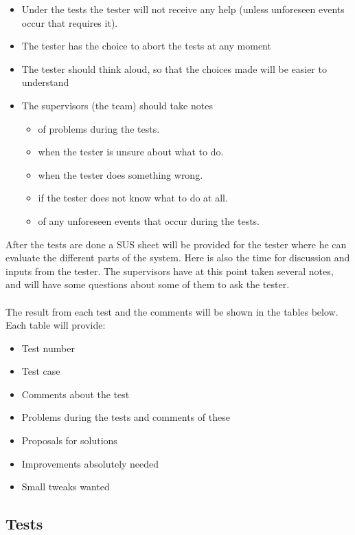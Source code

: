 \begin{itemize} \setlength{\itemsep}{0cm}\setlength{\parskip}{0cm}
	\item Under the tests the tester will not receive any help (unless unforeseen events occur that requires it).
	\item The tester has the choice to abort the tests at any moment
	\item The tester should think aloud, so that the choices made will be easier to understand
	\item The supervisors (the team) should take notes 
	\begin{itemize} \setlength{\itemsep}{0cm}\setlength{\parskip}{0cm}
		\item of problems during the tests.
		\item when the tester is unsure about what to do.
		\item when the tester does something wrong.
		\item if the tester does not know what to do at all.
		\item of any unforeseen events that occur during the tests.
	\end{itemize}
\end{itemize}
\noindent
After the tests are done a SUS sheet will be provided for the tester where he can evaluate the different parts of the system. Here is also the time for discussion and inputs from the tester. The supervisors have at this point taken several notes, and will have some questions about some of them to ask the tester.\\
\\
The result from each test and the comments will be shown in the tables below. Each table will provide:\\
\begin{itemize} \setlength{\itemsep}{0cm}\setlength{\parskip}{0cm}
	\item Test number
	\item Test case
	\item Comments about the test
	\item Problems during the tests and comments of these
	\item Proposals for solutions
	\item Improvements absolutely needed
	\item Small tweaks wanted
\end{itemize}
\subsection{Tests}



